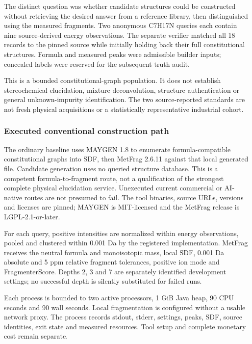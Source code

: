 \documentclass[
  10pt,
]{article}
\begin{document}
The distinct question was whether candidate structures could be
constructed without retrieving the desired answer from a reference
library, then distinguished using the measured fragments. Two anonymous
C7H17N queries each contain nine source-derived energy observations. The
separate verifier matched all 18 records to the pinned source while
initially holding back their full constitutional structures. Formula and
measured peaks were admissible builder inputs; concealed labels were
reserved for the subsequent truth audit.

This is a bounded constitutional-graph population. It does not establish
stereochemical elucidation, mixture deconvolution, structure
authentication or general unknown-impurity identification. The two
source-reported standards are not fresh physical acquisitions or a
statistically representative industrial cohort.

\hypertarget{executed-conventional-construction-path}{%
\subsubsection{Executed conventional construction
path}\label{executed-conventional-construction-path}}

The ordinary baseline uses MAYGEN 1.8 to enumerate formula-compatible
constitutional graphs into SDF, then MetFrag 2.6.11 against that local
generated file. Candidate generation uses no queried structure database.
This is a competent formula-to-fragment route, not a qualification of
the strongest complete physical elucidation service. Unexecuted current
commercial or AI-native routes are not presumed to fail. The tool
binaries, source URLs, versions and licenses are pinned; MAYGEN is
MIT-licensed and the MetFrag release is LGPL-2.1-or-later.

For each query, positive intensities are normalized within energy
observations, pooled and clustered within 0.001 Da by the registered
implementation. MetFrag receives the neutral formula and monoisotopic
mass, local SDF, 0.001 Da absolute and 5 ppm relative fragment
tolerances, positive ion mode and FragmenterScore. Depths 2, 3 and 7 are
separately identified development settings; no successful depth is
silently substituted for failed runs.

Each process is bounded to two active processors, 1 GiB Java heap, 90
CPU seconds and 90 wall seconds. Local fragmentation is configured
without a usable network proxy. The process records stdout, stderr,
settings, peaks, SDF, source identities, exit state and measured
resources. Tool setup and complete monetary cost remain separate.
\end{document}
